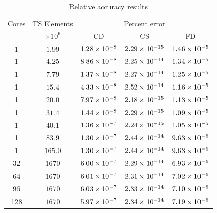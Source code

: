 \documentclass[preprint,12pt]{elsarticle}
\begin{document}
\begin{table}[tbp]    
  \scriptsize
  \centering
        \caption{Relative accuracy results} \label{tab:RelAcc}   
       \begin{tabular}{c c c c c}
         \toprule
         Cores & TS Elements & \multicolumn{3}{c}{Percent error} \\ 
         & $\times 10^6$ & CD & CS & FD \\
        \midrule
        1 & $\num{1.99}$ &  $\num{1.28E-8}$ &  $\num{2.29E-15}$ &  $\num{1.46E-5}$ \\
        1 & $\num{4.25}$ &  $\num{8.86E-8}$ &  $\num{2.25E-14}$ &  $\num{1.34E-5}$ \\
        1 & $\num{7.79}$ &  $\num{1.37E-8}$ &  $\num{2.27E-14}$ &  $\num{1.25E-5}$ \\
        1 & $\num{15.4}$ &  $\num{4.33E-8}$ &  $\num{2.52E-14}$ &  $\num{1.16E-5}$ \\
        1 & $\num{20.0}$ &  $\num{7.97E-8}$ &  $\num{2.18E-15}$ &  $\num{1.13E-5}$ \\
        1 & $\num{31.4}$ &  $\num{1.44E-8}$ &  $\num{2.29E-15}$ &  $\num{1.09E-5}$ \\
        1 & $\num{40.1}$ &  $\num{1.36E-7}$ &  $\num{2.24E-15}$ &  $\num{1.05E-5}$ \\
        1 & $\num{83.9}$ &  $\num{1.30E-7}$ &  $\num{2.44E-14}$ &  $\num{9.63E-6}$ \\
        1 & $\num{165.0}$ &  $\num{1.30E-7}$ &  $\num{2.44E-14}$ &  $\num{9.63E-6}$ \\
        32 & $\num{1670}$ &  $\num{6.00E-7}$ &  $\num{2.29E-14}$ &  $\num{6.93E-6}$ \\
        64 & $\num{1670}$ &  $\num{6.01E-7}$ &  $\num{2.31E-14}$ &  $\num{7.02E-6}$ \\
        96 & $\num{1670}$ &  $\num{6.03E-7}$ &  $\num{2.33E-14}$ &  $\num{7.10E-6}$ \\
        128 & $\num{1670}$ &  $\num{5.97E-7}$ &  $\num{2.34E-14}$ &  $\num{7.19E-6}$ \\
        \bottomrule
    \end{tabular}
\end{table}
\end{document}
